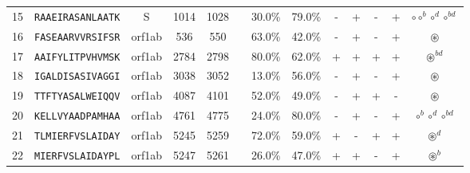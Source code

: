 \begin{tabular}{rcccccccccccc}
15 &  \texttt{RAAEIRASANLAATK} &       S &   1014 &  1028 &                &                          30.0\% &                           79.0\% &          - &           + &          - &           + &                                                                                    $ \circ \circ^b \circ^d \circ^{bd} $ \\
16 &  \texttt{FASEAARVVRSIFSR} &  orf1ab &    536 &   550 &                &                          63.0\% &                           42.0\% &          - &           + &          - &           + &                                                                                                         $ \circledast $ \\
17 &  \texttt{AAIFYLITPVHVMSK} &  orf1ab &   2784 &  2798 &                &                          80.0\% &                           62.0\% &          + &           + &          + &           + &                                                                                                    $ \circledast^{bd} $ \\
18 &  \texttt{IGALDISASIVAGGI} &  orf1ab &   3038 &  3052 &                &                          13.0\% &                           56.0\% &          - &           + &          - &           + &                                                                                                         $ \circledast $ \\
19 &  \texttt{TTFTYASALWEIQQV} &  orf1ab &   4087 &  4101 &                &                          52.0\% &                           49.0\% &          - &           + &          + &           - &                                                                                                         $ \circledast $ \\
20 &  \texttt{KELLVYAADPAMHAA} &  orf1ab &   4761 &  4775 &                &                          24.0\% &                           80.0\% &          - &           + &          - &           + &                                                                                          $ \circ^b \circ^d \circ^{bd} $ \\
21 &  \texttt{TLMIERFVSLAIDAY} &  orf1ab &   5245 &  5259 &                &                          72.0\% &                           59.0\% &          + &           - &          + &           + &                                                                                                       $ \circledast^d $ \\
22 &  \texttt{MIERFVSLAIDAYPL} &  orf1ab &   5247 &  5261 &                &                          26.0\% &                           47.0\% &          + &           + &          - &           + &                                                                                                       $ \circledast^b $ \\

\end{tabular}
